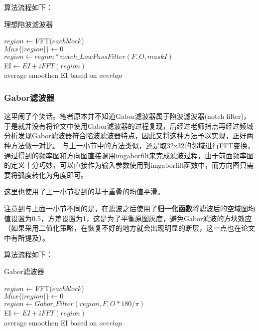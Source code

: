\documentclass[UTF8]{ctexart}
\begin{document}
算法流程如下：

\begin{algorithm}[H]
    \caption{理想陷波滤波器}
    {
        $region$ ← FFT($eachblock$)\\
        $Max\{|region|\} \leftarrow  0$ \\

        $region \leftarrow region * notch\_LowPassFilter(F,O,maskI)$\\
        EI$\leftarrow EI + iFFT(region)$\\
        average smoothen EI based on $overlap$
    }
\end{algorithm}

\subsubsection{Gabor滤波器}
这里闹了个笑话。笔者原本并不知道Gabor滤波器属于陷波滤波器(notch filter)，于是就并没有将论文\cite{ref1}中使用Gabor滤波器的过程复现，后经过老师指点再经过频域分析发现Gabor滤波器符合陷波滤波器特点，因此又将这种方法予以实现，正好两种方法做一对比。
与上一小节中的方法类似，还是取32x32的邻域进行FFT变换，通过得到的频率图和方向图直接调用imgaborfilt来完成滤波过程，由于前面频率图的定义十分巧妙，可以直接作为输入参数使用到imgaborfilt函数中，而方向图只需要将弧度转化为角度即可。

这里也使用了上一小节提到的基于重叠的均值平滑。

注意到与上面一小节不同的是，在滤波之后使用了\textbf{归一化函数}将滤波后的空域图均值设置为0.5，方差设置为1，这是为了平衡原图灰度，避免Gabor滤波的方块效应（如果采用二值化策略，在恢复不好的地方就会出现明显的断层，这一点也在论文中有所提及）。

算法流程如下：

\begin{algorithm}[H]
    \caption{Gabor滤波器}
    {
        $region$ ← FFT($eachblock$)\\
        $Max\{|region|\} \leftarrow  0$ \\

        $region \leftarrow Gabor\_Filter(region,F,O*180/\pi)$\\
        EI$\leftarrow EI + iFFT(region)$\\
        average smoothen EI based on $overlap$
    }
\end{algorithm}
\end{document}

